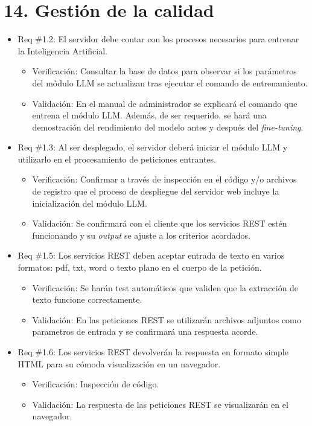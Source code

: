 \documentclass[
11pt, %
]{Clases/charter}
\begin{document}
\section{14. Gestión de la calidad}
\label{sec:calidad}

\begin{itemize}
	\item Req \#1.2: El servidor debe contar con los procesos necesarios para entrenar la Inteligencia Artificial.
	      \begin{itemize}
		      \item Verificación: Consultar la base de datos para observar si los parámetros del módulo LLM se actualizan tras ejecutar el comando de entrenamiento.
		      \item Validación: En el manual de administrador se explicará el comando que entrena el módulo LLM.
		            Además, de ser requerido, se hará una demostración del rendimiento del modelo antes y después del \textit{fine-tuning}.
	      \end{itemize}

	\item Req \#1.3: Al ser desplegado, el servidor deberá iniciar el módulo LLM y utilizarlo en el procesamiento de peticiones entrantes.
	      \begin{itemize}
		      \item Verificación: Confirmar a través de inspección en el código y/o archivos de registro que el proceso de despliegue del servidor web incluye la inicialización del módulo LLM.
		      \item Validación: Se confirmará con el cliente que los servicios REST estén funcionando y su \textit{output} se ajuste a los criterios acordados.
	      \end{itemize}

	\item Req \#1.5: Los servicios REST deben aceptar entrada de texto en varios formatos: pdf, txt, word o texto plano en el cuerpo de la petición.
	      \begin{itemize}
		      \item Verificación: Se harán test automáticos que validen que la extracción de texto funcione correctamente.
		      \item Validación: En las peticiones REST se utilizarán archivos adjuntos como parametros de entrada y se confirmará una respuesta acorde.
	      \end{itemize}

	\item Req \#1.6: Los servicios REST devolverán la respuesta en formato simple HTML para su cómoda visualización en un navegador.
	      \begin{itemize}
		      \item Verificación: Inspección de código.
		      \item Validación: La respuesta de las peticiones REST se visualizarán en el navegador.
	      \end{itemize}


\end{itemize}
\end{document}

